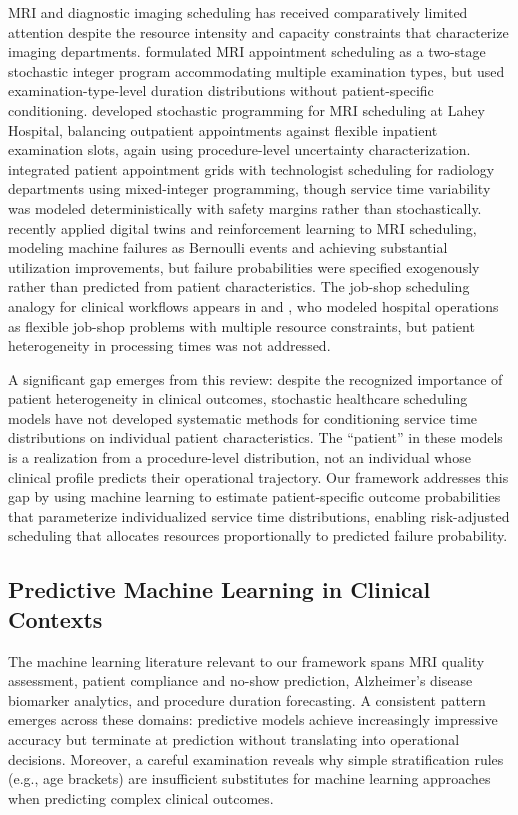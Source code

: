 \documentclass[msom,blindrev]{informs3}
\begin{document}
MRI and diagnostic imaging scheduling has received comparatively limited attention despite the resource intensity and capacity constraints that characterize imaging departments. \citet{qiu2019mri} formulated MRI appointment scheduling as a two-stage stochastic integer program accommodating multiple examination types, but used examination-type-level duration distributions without patient-specific conditioning. \citet{li2021stochastic} developed stochastic programming for MRI scheduling at Lahey Hospital, balancing outpatient appointments against flexible inpatient examination slots, again using procedure-level uncertainty characterization. \citet{bouguerra2023integrating} integrated patient appointment grids with technologist scheduling for radiology departments using mixed-integer programming, though service time variability was modeled deterministically with safety margins rather than stochastically. \citet{lopez2025mri} recently applied digital twins and reinforcement learning to MRI scheduling, modeling machine failures as Bernoulli events and achieving substantial utilization improvements, but failure probabilities were specified exogenously rather than predicted from patient characteristics. The job-shop scheduling analogy for clinical workflows appears in \citet{burdett2018flexible} and \citet{pham2008surgical}, who modeled hospital operations as flexible job-shop problems with multiple resource constraints, but patient heterogeneity in processing times was not addressed.

A significant gap emerges from this review: despite the recognized importance of patient heterogeneity in clinical outcomes, stochastic healthcare scheduling models have not developed systematic methods for conditioning service time distributions on individual patient characteristics. The ``patient'' in these models is a realization from a procedure-level distribution, not an individual whose clinical profile predicts their operational trajectory. Our framework addresses this gap by using machine learning to estimate patient-specific outcome probabilities that parameterize individualized service time distributions, enabling risk-adjusted scheduling that allocates resources proportionally to predicted failure probability.

\subsection{Predictive Machine Learning in Clinical Contexts}

The machine learning literature relevant to our framework spans MRI quality assessment, patient compliance and no-show prediction, Alzheimer's disease biomarker analytics, and procedure duration forecasting. A consistent pattern emerges across these domains: predictive models achieve increasingly impressive accuracy but terminate at prediction without translating into operational decisions. Moreover, a careful examination reveals why simple stratification rules (e.g., age brackets) are insufficient substitutes for machine learning approaches when predicting complex clinical outcomes.
\end{document}

